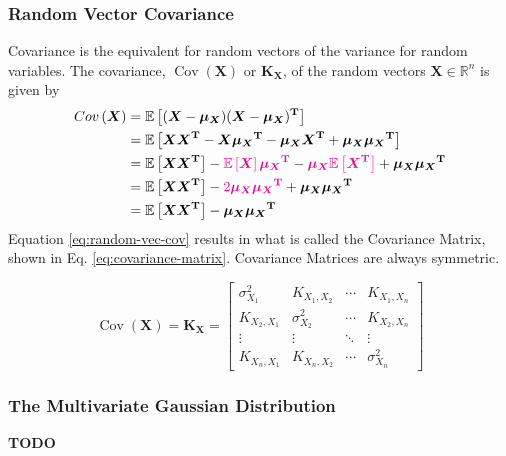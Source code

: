 \documentclass[12pt]{article}
\newcommand{\mat}[1]{\boldsymbol{\mathbf{#1}}}
\newcommand{\brac}[1]{\left[#1\right]} %
\newcommand{\parentheses}[1]{\left(#1\right)}
\newcommand{\R}{\mathbb{R}}
\newcommand{\cov}[1]{\mathop{Cov}\parentheses{#1}}
\newcommand{\mb}[1]{{\boldsymbol{#1}}} %
\newcommand{\expv}[1]{\mathbb{E}\brac{#1}} %
\newcommand{\magenta}[1]{\color{magenta}#1\color{black}}
\begin{document}
\subsubsection{Random Vector Covariance}
Covariance is the equivalent for random vectors of the variance for random variables. The covariance, $\cov{\mb{X}}$ or $\mat{K}_{\mb{X}}$, of the random vectors $\mb{X} \in \R^n$ is given by
\begin{equation}
    \begin{aligned}
        \cov{\mb{X}} &= \expv{(\mb{X} - \mb{\mu_X}) (\mb{X} - \mb{\mu_X})^\mathbf{T}} \\
        &= \expv{\mb{X}\mb{X}^\mathbf{T} - \mb{X}\mb{\mu_X}^\mathbf{T} - \mb{\mu_X}\mb{X}^{\mathbf{T}} + \mb{\mu_X} \mb{\mu_X}^\mathbf{T}} \\
        &= \expv{\mb{X}\mb{X}^\mathbf{T}} - \magenta{\expv{\mb{X}}\mb{\mu_X}^\mathbf{T}} - \magenta{\mb{\mu_X}\expv{\mb{X}^{\mathbf{T}}}} + \mb{\mu_X} \mb{\mu_X}^\mathbf{T}\\
        &= \expv{\mb{X}\mb{X}^\mathbf{T}} - \magenta{2 \mb{\mu_X} \mb{\mu_X}^\mathbf{T}} + \mb{\mu_X} \mb{\mu_X}^\mathbf{T}\\
        &= \expv{\mb{X}\mb{X}^\mathbf{T}} - \mb{\mu_X} \mb{\mu_X}^\mathbf{T}
    \end{aligned}
    \label{eq:random-vec-cov}
\end{equation}
Equation \ref{eq:random-vec-cov} results in what is called the Covariance Matrix, shown in Eq. \ref{eq:covariance-matrix}. Covariance Matrices are always symmetric.

\begin{equation}
    \cov{\mb{X}} = \mat{K}_{\mb{X}} = \begin{bmatrix}
        \sigma^2_{X_1} & K_{X_1, X_2} & \cdots & K_{X_1, X_n} \\
        K_{X_2, X_1} & \sigma^2_{X_2} & \cdots & K_{X_2, X_n} \\
        \vdots & \vdots & \ddots & \vdots \\
        K_{X_n, X_1} & K_{X_n, X_2} & \cdots & \sigma_{X_n}^2
    \end{bmatrix}
    \label{eq:covariance-matrix}
\end{equation}

\subsubsection{The Multivariate Gaussian Distribution}
\magenta{\textbf{TODO}}
\end{document}
